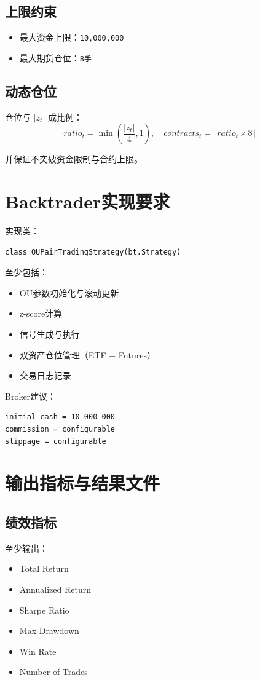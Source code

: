 \documentclass[11pt]{article}
\begin{document}
\subsection{上限约束}
\begin{itemize}
  \item 最大资金上限：\texttt{10,000,000}
  \item 最大期货仓位：\texttt{8手}
\end{itemize}

\subsection{动态仓位}
仓位与 $|z_t|$ 成比例：
\[
ratio_t = \min\left(\frac{|z_t|}{4}, 1\right),\quad
contracts_t = \lfloor ratio_t \times 8 \rfloor
\]

并保证不突破资金限制与合约上限。

\section{Backtrader实现要求}
实现类：
\begin{lstlisting}
class OUPairTradingStrategy(bt.Strategy)
\end{lstlisting}

至少包括：
\begin{itemize}
  \item OU参数初始化与滚动更新
  \item z-score计算
  \item 信号生成与执行
  \item 双资产仓位管理（ETF + Futures）
  \item 交易日志记录
\end{itemize}

Broker建议：
\begin{lstlisting}
initial_cash = 10_000_000
commission = configurable
slippage = configurable
\end{lstlisting}

\section{输出指标与结果文件}
\subsection{绩效指标}
至少输出：
\begin{itemize}
  \item Total Return
  \item Annualized Return
  \item Sharpe Ratio
  \item Max Drawdown
  \item Win Rate
  \item Number of Trades
\end{itemize}
\end{document}
